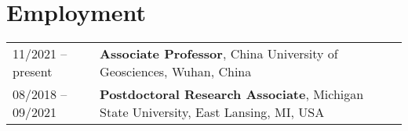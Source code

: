 \section*{Employment}
\begin{tabular}{p{} p{}}
11/2021 -- present & \textbf{Associate Professor},
					  China University of Geosciences, Wuhan, China \\
08/2018 -- 09/2021 & \textbf{Postdoctoral Research Associate},
		              Michigan State University, East Lansing, MI, USA \\
\end{tabular}

